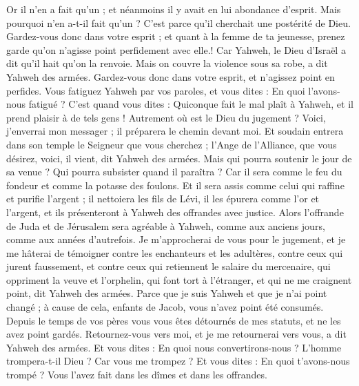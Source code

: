 \begin{multicols}{2}
Or il n'en a fait qu'un ; et néanmoins il y avait en lui abondance d'esprit. Mais pourquoi n'en a-t-il fait qu'un ? C'est parce qu'il cherchait une postérité de Dieu. Gardez-vous donc dans votre esprit ; et quant à la femme de ta jeunesse, prenez garde qu'on n'agisse point perfidement avec elle.!
Car Yahweh, le Dieu d'Israël a dit qu'il hait qu'on la renvoie. Mais on couvre la violence sous sa robe, a dit Yahweh des armées. Gardez-vous donc dans votre esprit, et n'agissez point en perfides.
Vous fatiguez Yahweh par vos paroles, et vous dites : En quoi l'avons-nous fatigué ? C'est quand vous dites : Quiconque fait le mal plaît à Yahweh, et il prend plaisir à de tels gens ! Autrement où est le Dieu du jugement ?
\VerseOne{}Voici, j'enverrai mon messager ; il préparera le chemin devant moi. Et soudain entrera dans son temple le Seigneur que vous cherchez ; l’Ange de l'Alliance, que vous désirez, voici, il vient, dit Yahweh des armées.
Mais qui pourra soutenir le jour de sa venue ? Qui pourra subsister quand il paraîtra ? Car il sera comme le feu du fondeur et comme la potasse des foulons.
Et il sera assis comme celui qui raffine et purifie l'argent ; il nettoiera les fils de Lévi, il les épurera comme l’or et l'argent, et ils présenteront à Yahweh des offrandes avec justice.
Alors l’offrande de Juda et de Jérusalem sera agréable à Yahweh, comme aux anciens jours, comme aux années d'autrefois.
Je m'approcherai de vous pour le jugement, et je me hâterai de témoigner contre les enchanteurs et les adultères, contre ceux qui jurent faussement, et contre ceux qui retiennent le salaire du mercenaire, qui oppriment la veuve et l'orphelin, qui font tort à l'étranger, et qui ne me craignent point, dit Yahweh des armées.
Parce que je suis Yahweh et que je n'ai point changé ; à cause de cela, enfants de Jacob, vous n'avez point été consumés.
Depuis le temps de vos pères vous vous êtes détournés de mes statuts, et ne les avez point gardés. Retournez-vous vers moi, et je me retournerai vers vous, a dit Yahweh des armées. Et vous dites : En quoi nous convertirons-nous ?
L'homme trompera-t-il Dieu ? Car vous me trompez ? Et vous dites : En quoi t'avons-nous trompé ? Vous l'avez fait dans les dîmes et dans les offrandes.

\end{multicols}
